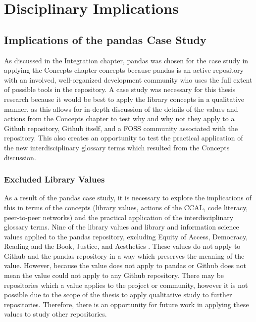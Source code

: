 \chapter{Disciplinary Implications} 
\label{ch:experiments}

\section{Implications of the pandas Case Study}

As discussed in the Integration chapter, pandas was chosen for the case study in applying the Concepts chapter concepts because pandas is an active repository with an involved, well-organized development community who uses the full extent of possible tools in the repository. A case study was necessary for this thesis research because it would be best to apply the library concepts in a qualitative manner, as this allows for in-depth discussion of the details of the values and actions from the Concepts chapter to test why and why not they apply to a Github repository, Github itself, and a FOSS community associated with the repository. This also creates an opportunity to test the practical application of the new interdisciplinary glossary terms which resulted from the Concepts discussion. 

\subsection{Excluded Library Values}

As a result of the pandas case study, it is necessary to explore the implications of this in terms of the concepts (library values, actions of the CCAL, code literacy, peer-to-peer networks) and the practical application of the interdisciplinary glossary terms. Nine of the library values and library and information science values applied to the pandas repository, excluding Equity of Access, Democracy, Reading and the Book, Justice, and Aesthetics \cite{gorman2000values}\cite{rubin2016foundationslis}. These values do not apply to Github and the pandas repository in a way which preserves the meaning of the value. However, because the value does not apply to pandas or Github does not mean the value could not apply to any Github repository. There may be repositories which a value applies to the project or community, however it is not possible due to the scope of the thesis to apply qualitative study to further repositories. Therefore, there is an opportunity for future work in applying these values to study other repositories. 


